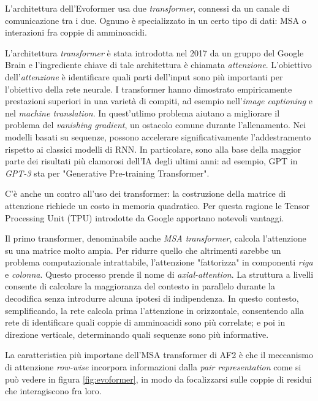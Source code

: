 L'architettura dell'Evoformer usa due \textit{transformer}, connessi da un canale di comunicazione tra i due. Ognuno è specializzato in un certo tipo di dati: MSA o interazioni fra coppie di amminoacidi. 

\par L'architettura \textit{transformer} è stata introdotta nel 2017 da un gruppo del Google Brain\supercite{vaswani2017attention} e l'ingrediente chiave 
di tale architettura è chiamata \textit{attenzione}. L'obiettivo dell'\textit{attenzione} è identificare quali parti dell'input sono più importanti per l'obiettivo della rete neurale. I transformer hanno dimostrato empiricamente prestazioni superiori in una varietà di compiti, ad esempio nell'\textit{image captioning} e nel \textit{machine translation}. In quest'utlimo problema aiutano a migliorare il problema del \textit{vanishing gradient}, un ostacolo comune durante l'allenamento. Nei modelli basati su sequenze, possono accelerare significativamente l'addestramento rispetto ai classici modelli di RNN. In particolare, sono alla base della maggior parte dei risultati più clamorosi dell'IA degli ultimi anni: ad esempio, GPT in \textit{GPT-3} sta per "Generative Pre-training Transformer".

\par C'è anche un contro all'uso dei transformer: la costruzione della matrice di attenzione richiede un costo in memoria quadratico. Per questa ragione le Tensor Processing Unit (TPU) introdotte da Google apportano notevoli vantaggi.

\par Il primo transformer, denominabile anche \textit{MSA transformer}, calcola l'attenzione su una matrice molto ampia. Per ridurre quello che altrimenti sarebbe un problema computazionale intrattabile, l'attenzione "fattorizza" in componenti \textit{riga} e \textit{colonna}. Questo processo prende il nome di \textit{axial-attention}. La struttura a livelli consente di calcolare la maggioranza del contesto in parallelo durante la decodifica senza introdurre alcuna ipotesi di indipendenza. In questo contesto, semplificando, la rete calcola prima l'attenzione in orizzontale, consentendo alla rete di identificare quali coppie di amminoacidi sono più correlate; e poi in direzione verticale, determinando quali sequenze sono più informative. 

\par La caratteristica più importane dell'MSA transformer di AF2 è che il meccanismo di attenzione \textit{row-wise} incorpora informazioni dalla \textit{pair representation} come si può vedere in figura \ref{fig:evoformer}, in modo da focalizzarsi sulle coppie di residui che interagiscono fra loro.

